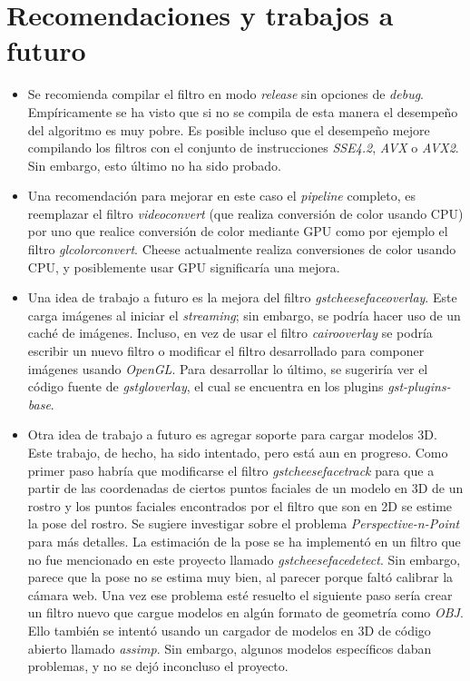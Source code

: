 \documentclass[a4paper,openright,12pt]{report}
\begin{document}
\section{Recomendaciones y trabajos a futuro}
  \begin{itemize}
    \item
      Se recomienda compilar el filtro en modo \textit{release} sin opciones de
      \textit{debug}. Empíricamente se ha visto que si no se compila de esta
      manera el desempeño del algoritmo es muy pobre. Es posible incluso que el
      desempeño mejore compilando los filtros con el conjunto de instrucciones
      \textit{SSE4.2}, \textit{AVX} o \textit{AVX2}. Sin embargo, esto último no
      ha sido probado.
    \item
      Una recomendación para mejorar en este caso el \textit{pipeline} completo,
      es reemplazar el filtro \textit{videoconvert} (que realiza conversión de
      color usando CPU) por uno que realice conversión de color mediante GPU
      como por ejemplo el filtro \textit{glcolorconvert}. Cheese actualmente
      realiza conversiones de color usando CPU, y posiblemente usar GPU
      significaría una mejora.
    \item
      Una idea de trabajo a futuro es la mejora del filtro
      \textit{gstcheesefaceoverlay}. Este carga imágenes al iniciar el
      \textit{streaming}; sin embargo, se podría hacer uso de un caché de
      imágenes. Incluso, en vez de usar el filtro \textit{cairooverlay} se
      podría escribir un nuevo filtro o modificar el filtro desarrollado para
      componer imágenes usando \textit{OpenGL}. Para desarrollar lo último, se
      sugeriría ver el código fuente de \textit{gstgloverlay}, el cual se
      encuentra en los plugins \textit{gst-plugins-base}.
    \item
      Otra idea de trabajo a futuro es agregar soporte para cargar modelos 3D.
      Este trabajo, de hecho, ha sido intentado, pero está aun en progreso. Como
      primer paso habría que modificarse el filtro \textit{gstcheesefacetrack}
      para que a partir de las coordenadas de ciertos puntos faciales de un
      modelo en 3D de un rostro y los puntos faciales encontrados por el filtro
      que son en 2D se estime la pose del rostro. Se sugiere investigar sobre el
      problema \textit{Perspective-n-Point} para más detalles. La estimación de
      la pose se ha implementó en un filtro que no fue mencionado en este proyecto
      llamado \textit{gstcheesefacedetect}. Sin embargo, parece que la pose no
      se estima muy bien, al parecer porque faltó calibrar la cámara web.
      Una vez ese problema esté resuelto el siguiente paso sería crear un filtro
      nuevo que cargue modelos en algún formato de geometría como \textit{OBJ}.
      Ello también se intentó usando un cargador de modelos en 3D de código
      abierto llamado \textit{assimp}. Sin embargo, algunos modelos específicos
      daban problemas, y no se dejó inconcluso el proyecto.
  \end{itemize}
    
\end{document}
